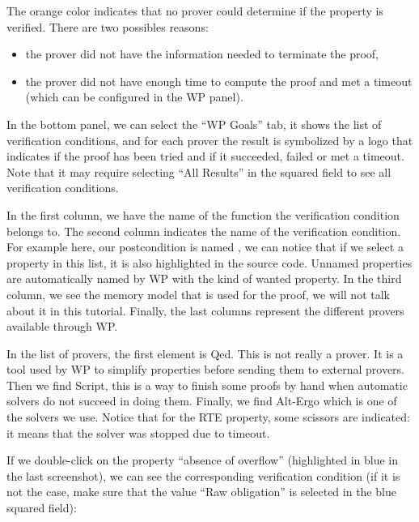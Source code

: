 The orange color indicates that no prover could determine if the
property is verified. There are two possibles reasons:
\begin{itemize}
\item the prover did not have the information needed to terminate the proof,
\item the prover did not have enough time to compute the proof and
  met a timeout (which can be configured in the WP panel).
\end{itemize}


In the bottom panel, we can select the ``WP Goals'' tab, it shows the list of
verification conditions, and for each prover the result is symbolized
by a logo that indicates if the proof has been tried and if it
succeeded, failed or met a timeout. Note that it
may require selecting ``All Results'' in the squared field to see all
verification conditions.




In the first column, we have the name of the function the verification
condition belongs to. The second column indicates the name of the verification
condition. For example here, our postcondition is named
, we can notice
that if we select a property in this list, it is also highlighted in the
source code. Unnamed properties are automatically named by WP with the
kind of wanted property. In the third column, we see the memory model
that is used for the proof, we will not talk about it in this tutorial.
Finally, the last columns represent the different provers available
through WP.



In the list of provers, the first element is Qed. This is not really a prover.
It is a tool used by WP to simplify properties before sending them to external
provers. Then we find Script, this is a way to finish some proofs by hand when
automatic solvers do not succeed in doing them. Finally, we find Alt-Ergo
which is one of the solvers we use. Notice that for the RTE property, some
scissors are indicated: it means that the solver was stopped due to timeout.



If we double-click on the property ``absence of overflow''
(highlighted in blue in the last screenshot), we can see the corresponding
verification condition (if it is not the case, make sure that the value ``Raw
obligation'' is selected in the blue squared field):



